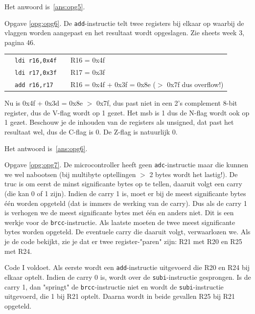 \documentclass[a4paper,12pt,fleqn,dutch]{tisdexam}
\begin{document}
\begin{questions}
Het anwoord is~\ref{ans:opg5}.

\vspace{1em}
Opgave \ref{opg:opg6}. De \texttt{add}-instructie telt twee registers bij elkaar op waarbij de
vlaggen worden aangepast en het resultaat wordt opgeslagen. Zie sheets week 3,
pagina 46.

\begin{table}[h!]
	\begin{tabular}{l l l l}
		 & \texttt{ldi r16,0x4f}   &  &  R16 = 0x4f  \\ 
	 	 & \texttt{ldi r17,0x3f}   &  &  R17 = 0x3f  \\ 
		 & \texttt{add r16,r17}    &  &  R16 = 0x4f + 0x3f = 0x8e ($>$ 0x7f dus overflow!) \\ 
	\end{tabular} 
\end{table}

Nu is 0x4f + 0x3d = 0x8e $>$ 0x7f, dus past niet in een 2's complement 8-bit
register, dus de V-flag wordt op 1 gezet. Het msb is 1 dus de N-flag wordt ook
op 1 gezet. Beschouw je de inhouden van de registers als unsigned, dat past het
resultaat wel, dus de C-flag is 0. De Z-flag is natuurlijk 0.

Het antwoord is~\ref{ans:opg6}.

\vspace{1em}
Opgave \ref{opg:opg7}. De microcontroller heeft geen \texttt{adc}-instructie maar die
kunnen we wel nabootsen (bij multibyte optellingen $>$ 2 bytes wordt het
lastig!). De truc is om eerst de minst significante bytes op te tellen,
daaruit volgt een carry (die kan 0 of 1 zijn). Indien de carry 1 is, moet er
bij de meest significante bytes \'{e}\'{e}n worden opgeteld (dat is immers de
werking van de carry). Dus als de carry 1 is verhogen we de meest significante
bytes met \'{e}\'{e}n en anders niet. Dit is een werkje voor de
\texttt{brcc}-instructie. Als laatste moeten de twee meest significante bytes
worden opgeteld. De eventuele carry die daaruit volgt, verwaarlozen we. Als je
de code bekijkt, zie je dat er twee register-"paren" zijn: R21 met R20 en R25
met R24.

Code I voldoet. Als eerste wordt een \texttt{add}-instructie uitgevoerd die R20
en R24 bij elkaar optelt. Indien de carry 0 is, wordt over de
\texttt{subi}-instructie gesprongen. Is de carry 1, dan "springt" de
\texttt{brcc}-instructie niet en wordt de \texttt{subi}-instructie uitgevoerd,
die 1 bij R21 optelt. Daarna wordt in beide gevallen R25 bij R21 opgeteld.


\end{questions}
\end{document}
